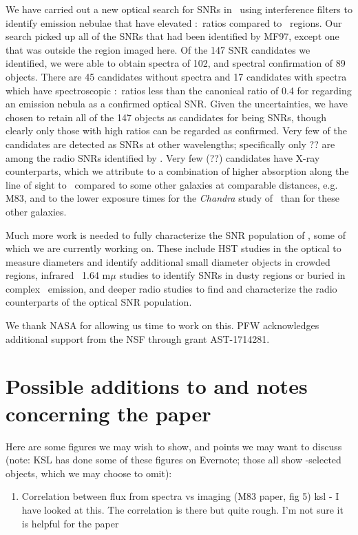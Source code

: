 We have carried out a new optical search for SNRs in \gal\ using interference filters to identify emission nebulae that have elevated \sii:\ha\ ratios compared to \hii\ regions.  Our search picked up all of the SNRs that had been identified by MF97, except one that was outside the region imaged here. Of the 147 SNR candidates we identified, we were able to obtain spectra of 102, and spectral confirmation of 89 objects.  There are 45 candidates  without spectra and 17 candidates with spectra which have spectroscopic \sii:\ha\ ratios less than the canonical ratio of 0.4 for regarding an emission nebula as a confirmed optical SNR.  Given the uncertainties, we have chosen to retain all of the 147 objects as candidates for being SNRs, though clearly only those with high ratios can be regarded as confirmed.  Very few of the candidates are detected as SNRs at other wavelengths; specifically only ?? are among the radio SNRs identified by \cite{lacey01}.  Very few (??) candidates have X-ray counterparts, which we attribute to a combination of higher absorption along the line of sight to \gal\ compared to some other galaxies at comparable distances, e.g. M83, and to the %
lower exposure times for the {\em Chandra} study of \gal\ than for these other galaxies. 

Much more work is needed to fully characterize the SNR population of \gal, some of which we are currently working on.  These include HST studies in the optical to measure diameters and identify additional small diameter objects in crowded regions, infrared \feii\ 1.64 m$\mu$ studies to identify SNRs in dusty regions or buried in complex \ha\ emission, and deeper radio studies to find and characterize the radio counterparts of the optical SNR population. 

\acknowledgments

We thank NASA for allowing us time to work on this.  PFW acknowledges additional support from the NSF through grant AST-1714281.

\pagebreak

\appendix

\section{Possible additions to and notes concerning the paper
}
Here are some figures we may wish to show, and points we may want to discuss (note: KSL has done some of these figures on Evernote; those all show \oiii-selected objects, which we may choose to omit):
\begin{enumerate}
    \item Correlation between flux from spectra vs imaging (M83 paper, fig 5)  ksl - I have looked at this.  The correlation is there but quite rough.  I'm not sure it is helpful for the paper

\end{enumerate}

